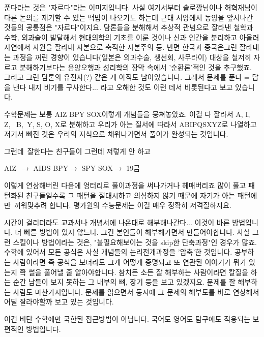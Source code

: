 푼다라는 것은 "자르다"라는 이미지입니다.
사실 여기서부터 솔로깡님이나 허혁재님이 다른 논의를 제기할 수 있는 떡밥이 나오기도 하는데
근대 서양에서 동양을 앞서나간 것들의 공통점은 "자르다"이지요.
담론들을 분해해서 추상적 관념으로 잘라낸 철학과 수학, 외과술이 발달해서 현대의학의 기초를 이룬 것이나
신과 인간을 분리하고 아울러 자연에서 자원을 잘라내 자본으로 축적한 자본주의 등.
반면 한국과 중국은그런 잘라내는 과정을 꺼린 경향이 있습니다(일본은 외과수술, 생선회, 사무라이)
대상을 철저히 자르고 분해하기보다는 음양오행과 성리학의 장막 속에서 '순환론'적인 것을 추구했죠.
그리고 그런 담론의 유전자(?) 같은 게 아직도 남아있습니다.
그래서 문제를 푼다 = 답을 낸다 내지 비기를 구사한다... 라고 오해한 것도 이런 데서 비롯된다고 보고 있습니다.
\vspace{5mm}

수학문제는 보통 AIZ BPY SOX이렇게 개념들을 뭉쳐놓았죠.
이걸 다 잘라서 A, I, Z,  B, Y, S, O, X로 분해하고
우리가 아는 질서에 따라서 ABIPQSXYZ로 나열하고
저기서 빠진 것은 우리의 지식으로 채워나가면서 풀이가 완성되는 것입니다.
\vspace{5mm}

그런데 잘한다는 친구들이 그런데 저렇게 안 하고
\vspace{5mm}

AIZ $\rightarrow$ AIDS
BPY$\rightarrow$ SPY
SOX$\rightarrow$ 19금
\vspace{5mm}

이렇게 연상해버린 다음에 엉터리로 풀이과정을 써나가거나 헤매버리죠
많이 풀고 패턴화된 친구들일수록 그 패턴을 절대시하고 의심하지 않기 때문에 자기가 아는 패턴에만 끼워맞추려 합니다.
평가원의 수능문제는 이걸 매우 정확히 저격질하지요.
\vspace{5mm}

시간이 걸리더라도 교과서나 개념서에 나온대로 해부해나간다... 이것이 바른 방법입니다.
더 빠른 방법이 있지 않느냐. 그건 본인들이 해부해가면서 만들어야합니다.
사실 그런 스킬이나 방법이라는 것은, "불필요해보이는 것을 skip한 단축과정"인 경우가 많죠.
수학에 있어서 모든 공식은 사실 개념들의 논리전개과정을 '압축'한 것입니다.
공부하는 사람이라면 즉 공식을 보더라도 그게 어떻게 증명되고 또 연관된 이야기가 뭐가 있는지 쫙 썰을 풀어낼 줄 알아야합니다.
참치든 소든 잘 해부하는 사람이라면 칼질을 하는 순간 남들이 보지 못하는 그 내부의 뼈, 장기 등을 보고 있겠지요.
문제를 잘 해부하는 사람도 마찬가지입니다. 문제를 읽으면서 동시에 그 문제의 해부도를 바로 연상해서 어딜 잘라야할까 보고 있는 것입니다.
\vspace{5mm}

이건 비단 수학에만 국한된 접근방법이 아닙니다.
국어도 영어도 탐구에도 적용되는 보편적인 방법입니다.
\vspace{5mm}

